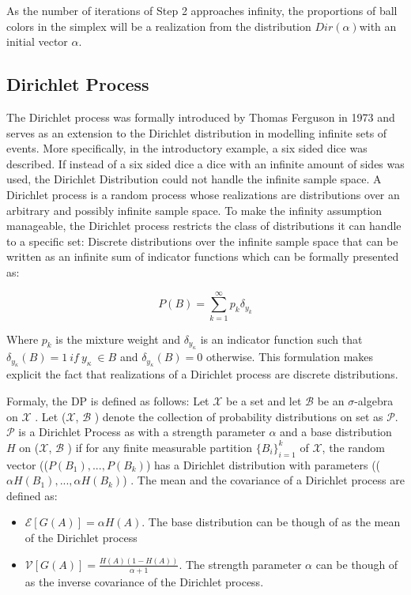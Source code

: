 \documentclass[twoside,hidelinks]{article}
\begin{document}
As the number of iterations of Step 2 approaches infinity, the proportions of ball colors in the simplex will be a realization from the distribution $Dir(\alpha)$with an initial vector $\alpha$.



\subsection{Dirichlet Process}

The Dirichlet process was formally introduced by Thomas Ferguson in 1973 and serves as an extension to the Dirichlet distribution in modelling infinite sets of events. More specifically, in the introductory example, a six sided dice was described. If instead of a six sided dice a dice with an infinite amount of sides was used, the Dirichlet Distribution could not handle the infinite sample space. A Dirichlet process is a random process whose realizations are distributions over an arbitrary and possibly infinite sample space. To make the infinity assumption manageable, the Dirichlet process restricts the class of distributions it can handle to a specific set: Discrete distributions over the infinite sample space that can be written as an infinite sum of indicator functions which can be formally presented as:

$$ P( B ) = \sum_{k=1}^\infty p_k \delta_{y_k}  $$

Where $p_k$ is the mixture weight and $\delta_{y_\kappa}$ is an indicator function such that $\delta_{y_\kappa} (B)=1\ if\ y_{\kappa}\ \in B$ and  $\delta_{y_\kappa}(B)=0$ otherwise. This formulation makes explicit the fact that realizations of a Dirichlet process are discrete distributions.

Formaly, the DP is defined as follows: Let $\mathcal{X}$ be a set and let $\mathcal{B}$ be an $\sigma$-algebra on $\mathcal{X}$ .  Let ($\mathcal{X} $, $\mathcal{B}$ )  denote the collection of probability distributions on set as $\mathcal{P} $. $\mathcal{P}$ is a Dirichlet Process as with a strength parameter $\alpha$ and a base distribution $H$ on ($\mathcal{X} $, $\mathcal{B} $ ) if for any finite measurable partition $ \{B_i\}_{i=1}^k$ of $\mathcal{X} $, the random vector (($ P(B_1), ..., P(B_k)$) has a Dirichlet distribution with parameters (($ \alpha H(B_1), ..., \alpha H(B_k)$) . The mean and the covariance of a Dirichlet process are defined as:
\begin{itemize}

	\item{ $ \mathcal{E}[G(A)] = \alpha H(A) $. The base distribution can be though of as the mean of the Dirichlet process}

	\item{$ \mathcal{V}[G(A)] = \frac{H(A)(1-H(A))}{\alpha + 1} $. The strength parameter $\alpha$ can be though of as the inverse covariance of the Dirichlet process. }
\end{itemize}
\end{document}
